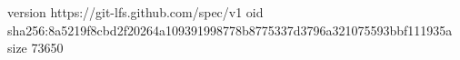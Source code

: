 version https://git-lfs.github.com/spec/v1
oid sha256:8a5219f8cbd2f20264a109391998778b8775337d3796a321075593bbf111935a
size 73650
